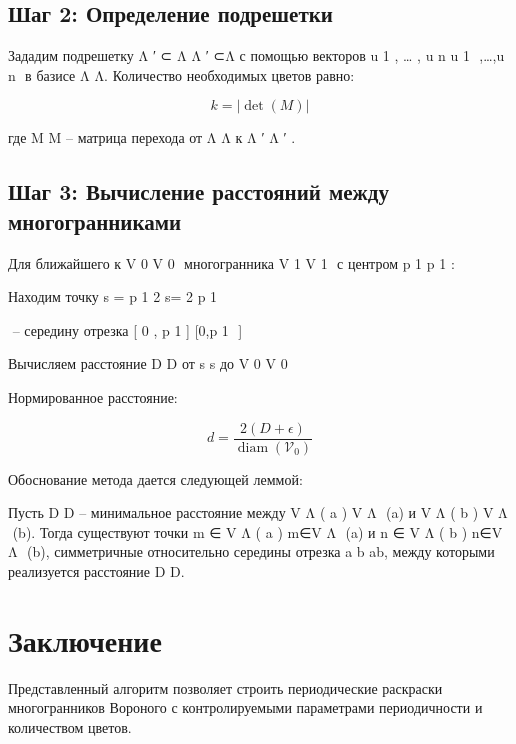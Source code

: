\documentclass[12pt]{article}
\begin{document}
\subsection{Шаг 2: Определение подрешетки}
Зададим подрешетку 
Λ
′
⊂
Λ
Λ 
′
 ⊂Λ с помощью векторов 
u
1
,
…
,
u
n
u 
1
​
 ,…,u 
n
​
  в базисе 
Λ
Λ. Количество необходимых цветов равно:

\begin{equation}
k = |\det(M)|
\end{equation}

где 
M
M -- матрица перехода от 
Λ
Λ к 
Λ
′
Λ 
′
 .

\subsection{Шаг 3: Вычисление расстояний между многогранниками}
Для ближайшего к 
V
0
V 
0
​
  многогранника 
V
1
V 
1
​
  с центром 
p
1
p 
1
​
 :

Находим точку 
s
=
p
1
2
s= 
2
p 
1
​
 
​
  -- середину отрезка 
[
0
,
p
1
]
[0,p 
1
​
 ]

Вычисляем расстояние 
D
D от 
s
s до 
V
0
V 
0
​
 

Нормированное расстояние:

\begin{equation}
d = \frac{2(D + \epsilon)}{\operatorname{diam}(\mathcal{V}_0)}
\end{equation}

Обоснование метода дается следующей леммой:

\begin{lemma} \label{lemma2}
Пусть 
D
D -- минимальное расстояние между 
V
Λ
(
a
)
V 
Λ
​
 (a) и 
V
Λ
(
b
)
V 
Λ
​
 (b). Тогда существуют точки 
m
∈
V
Λ
(
a
)
m∈V 
Λ
​
 (a) и 
n
∈
V
Λ
(
b
)
n∈V 
Λ
​
 (b), симметричные относительно середины отрезка 
a
b
ab, между которыми реализуется расстояние 
D
D.
\end{lemma}

\section{Заключение}
Представленный алгоритм позволяет строить периодические раскраски многогранников Вороного с контролируемыми параметрами периодичности и количеством цветов.





\geometry{a4paper, left=25mm, right=15mm, top=20mm, bottom=20mm}
\end{document}
